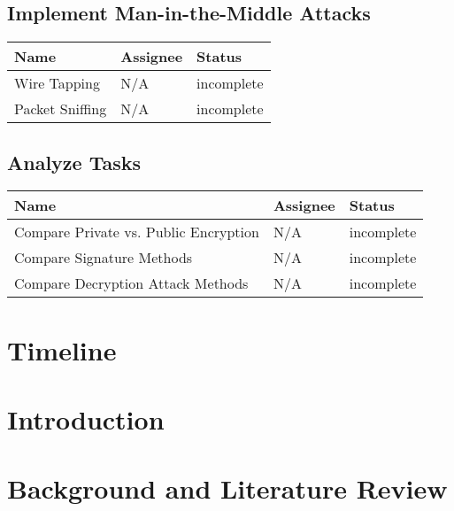 \documentclass{report}
\begin{document}
\subsection{Implement Man-in-the-Middle Attacks}
\begin{tabular}{l|l|l}
Name & Assignee & Status \\ \hline
Wire Tapping & N/A & incomplete \\
Packet Sniffing & N/A & incomplete 
\end{tabular}
\subsection{Analyze Tasks}
\begin{tabular}{l|l|l}
Name & Assignee & Status \\ \hline
Compare Private vs. Public Encryption & N/A & incomplete \\
Compare Signature Methods & N/A & incomplete \\
Compare Decryption Attack Methods & N/A & incomplete
\end{tabular}

\section{Timeline}

\section{Introduction}

\section{Background and Literature Review}

\iffalse 
\newpage

\begin{thebibliography}{9}

    \bibitem{ieee}
    IEEE-CS/ACM Joint Task Force on Software Engineering Ethics and Professional Practices\\
    \texttt{https://www.computer.org/web/education/code-of-ethics}

\end{thebibliography}
\fi
\end{document}
